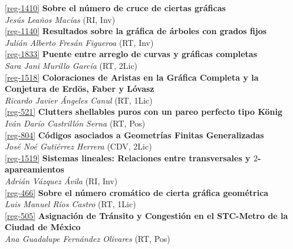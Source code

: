 \begin{multicols}{2}
\noindent  \ref{reg-1410}  {\bfseries Sobre el n\'umero de cruce de ciertas gr\'aficas}\\
{\slshape  Jes\'us  Lea\~nos Mac\'ias} {\footnotesize (RI, Inv)}\\

\noindent  \ref{reg-1140}  {\bfseries Resultados sobre la gr\'afica de \'arboles con grados fijos}\\
{\slshape  Juli\'an Alberto Fres\'an Figueroa} {\footnotesize (RT, Inv)}\\

\noindent  \ref{reg-1833}  {\bfseries Puente entre arreglo de curvas y gr\'aficas completas}\\
{\slshape  Sara Jani Murillo Garc\'ia} {\footnotesize (RT, 2Lic)}\\

\noindent  \ref{reg-1518}  {\bfseries Coloraciones de Aristas en la Gr\'afica Completa y la Conjetura de Erd\"os, Faber y L\'ovasz}\\
{\slshape  Ricardo Javier \'Angeles Canul} {\footnotesize (RT, 1Lic)}\\

\noindent  \ref{reg-521}  {\bfseries Clutters shellables puros con un pareo perfecto tipo K\"onig}\\
{\slshape  Iv\'an Dar\'io Castrill\'on Serna} {\footnotesize (RT, Pos)}\\

\noindent  \ref{reg-804}  {\bfseries C\'odigos asociados a Geometr\'ias Finitas Generalizadas}\\
{\slshape  Jos\'e No\'e Guti\'errez Herrera} {\footnotesize (CDV, 2Lic)}\\

\noindent  \ref{reg-1519}  {\bfseries Sistemas lineales: Relaciones entre transversales y $2$-apareamientos}\\
{\slshape  Adri\'an  V\'azquez \'Avila} {\footnotesize (RI, Inv)}\\

\noindent  \ref{reg-466}  {\bfseries Sobre el n\'umero crom\'atico de cierta gr\'afica geom\'etrica}\\
{\slshape  Luis Manuel R\'ios Castro} {\footnotesize (RT, 1Lic)}\\

\noindent  \ref{reg-505}  {\bfseries Asignaci\'on de Tr\'ansito y Congesti\'on en el STC-Metro de la Ciudad de M\'exico}\\
{\slshape  Ana Guadalupe Fern\'andez Olivares} {\footnotesize (RT, Pos)}\\


\end{multicols}
